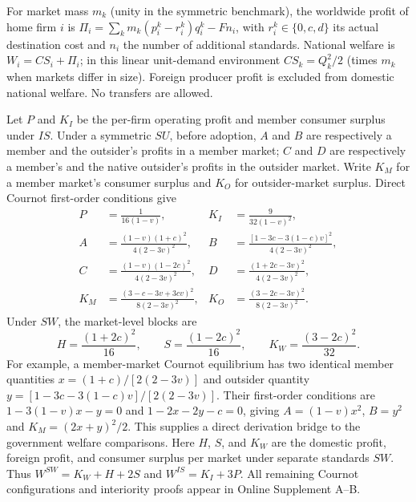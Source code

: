 For market mass $m_k$ (unity in the symmetric benchmark), the worldwide profit of home firm $i$ is $\Pi_i=\sum_k m_k(p_i^k-r_i^k)q_i^k-Fn_i$, with $r_i^k\in\{0,c,d\}$ its actual destination cost and $n_i$ the number of additional standards. National welfare is $W_i=CS_i+\Pi_i$; in this linear unit-demand environment $CS_k=Q_k^2/2$ (times $m_k$ when markets differ in size). Foreign producer profit is excluded from domestic national welfare. No transfers are allowed.

Let $P$ and $K_I$ be the per-firm operating profit and member consumer surplus under $IS$. Under a symmetric $SU$, before adoption, $A$ and $B$ are respectively a member and the outsider's profits in a member market; $C$ and $D$ are respectively a member's and the native outsider's profits in the outsider market. Write $K_M$ for a member market's consumer surplus and $K_O$ for outsider-market surplus. Direct Cournot first-order conditions give
\begin{align}\label{eq:short-blocks}
P&=\frac1{16(1-v)},& K_I&=\frac9{32(1-v)^2},\nonumber\\
A&=\frac{(1-v)(1+c)^2}{4(2-3v)^2},&B&=\frac{[1-3c-3(1-c)v]^2}{4(2-3v)^2},\nonumber\\
C&=\frac{(1-v)(1-2c)^2}{4(2-3v)^2},&D&=\frac{(1+2c-3v)^2}{4(2-3v)^2},\nonumber\\
K_M&=\frac{(3-c-3v+3cv)^2}{8(2-3v)^2},&K_O&=\frac{(3-2c-3v)^2}{8(2-3v)^2}.
\end{align}
Under $SW$, the market-level blocks are
\begin{equation}\label{eq:short-SW-blocks}
H=\frac{(1+2c)^2}{16},\qquad
S=\frac{(1-2c)^2}{16},\qquad
K_W=\frac{(3-2c)^2}{32}.
\end{equation}
For example, a member-market Cournot equilibrium has two identical member quantities $x=(1+c)/[2(2-3v)]$ and outsider quantity $y=[1-3c-3(1-c)v]/[2(2-3v)]$. Their first-order conditions are $1-3(1-v)x-y=0$ and $1-2x-2y-c=0$, giving $A=(1-v)x^2$, $B=y^2$ and $K_M=(2x+y)^2/2$. This supplies a direct derivation bridge to the government welfare comparisons. Here $H$, $S$, and $K_W$ are the domestic profit, foreign profit, and consumer surplus per market under separate standards $SW$. Thus $W^{SW}=K_W+H+2S$ and $W^{IS}=K_I+3P$. All remaining Cournot configurations and interiority proofs appear in Online Supplement A--B.
